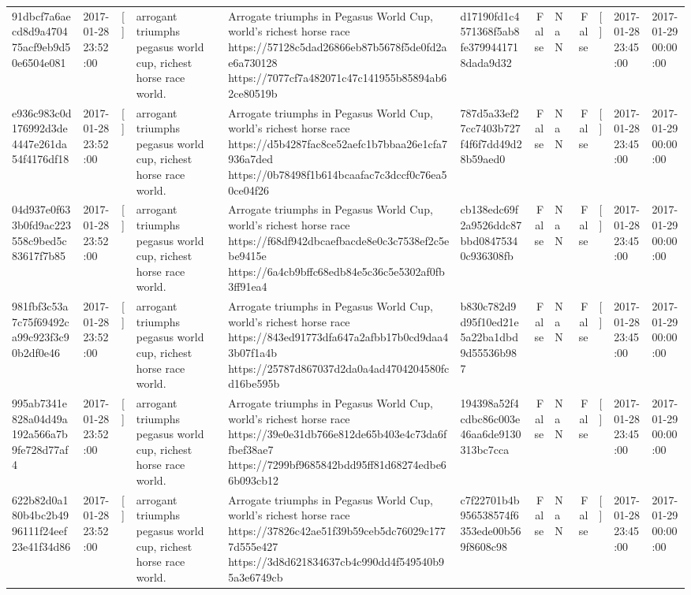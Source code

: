 \begin{tabular}{llllllrlrlll}
91dbcf7a6aecd8d9a470475acf9eb9d50e6504e081 & 2017-01-28 23:52:00 & [] & arrogant triumphs pegasus world cup, richest horse race world. & Arrogate triumphs in Pegasus World Cup, world's richest horse race https://57128c5dad26866eb87b5678f5de0fd2ae6a730128 https://7077cf7a482071c47c141955b85894ab62ce80519b & d17190fd1c4571368f5ab8fe3799441718dada9d32 & False & NaN & False & [] & 2017-01-28 23:45:00 & 2017-01-29 00:00:00 \\
e936c983c0d176992d3de4447e261da54f4176df18 & 2017-01-28 23:52:00 & [] & arrogant triumphs pegasus world cup, richest horse race world. & Arrogate triumphs in Pegasus World Cup, world's richest horse race https://d5b4287fac8ce52aefc1b7bbaa26e1cfa7936a7ded https://0b78498f1b614bcaafac7c3dccf0c76ea50ce04f26 & 787d5a33ef27cc7403b727f4f6f7dd49d28b59aed0 & False & NaN & False & [] & 2017-01-28 23:45:00 & 2017-01-29 00:00:00 \\
04d937e0f633b0fd9ac223558c9bed5c83617f7b85 & 2017-01-28 23:52:00 & [] & arrogant triumphs pegasus world cup, richest horse race world. & Arrogate triumphs in Pegasus World Cup, world's richest horse race https://f68df942dbcaefbacde8e0c3c7538ef2c5ebe9415e https://6a4cb9bffc68edb84e5c36c5e5302af0fb3ff91ea4 & cb138edc69f2a9526ddc87bbd08475340c936308fb & False & NaN & False & [] & 2017-01-28 23:45:00 & 2017-01-29 00:00:00 \\
981fbf3c53a7c75f69492ca99c923f3c90b2df0e46 & 2017-01-28 23:52:00 & [] & arrogant triumphs pegasus world cup, richest horse race world. & Arrogate triumphs in Pegasus World Cup, world's richest horse race https://843ed91773dfa647a2afbb17b0cd9daa43b07f1a4b https://25787d867037d2da0a4ad4704204580fcd16be595b & b830c782d9d95f10ed21e5a22ba1dbd9d55536b987 & False & NaN & False & [] & 2017-01-28 23:45:00 & 2017-01-29 00:00:00 \\
995ab7341e828a04d49a192a566a7b9fe728d77af4 & 2017-01-28 23:52:00 & [] & arrogant triumphs pegasus world cup, richest horse race world. & Arrogate triumphs in Pegasus World Cup, world's richest horse race https://39e0e31db766e812de65b403e4c73da6ffbef38ae7 https://7299bf9685842bdd95ff81d68274edbe66b093cb12 & 194398a52f4cdbc86c003e46aa6de9130313bc7cca & False & NaN & False & [] & 2017-01-28 23:45:00 & 2017-01-29 00:00:00 \\
622b82d0a180b4bc2b4996111f24eef23e41f34d86 & 2017-01-28 23:52:00 & [] & arrogant triumphs pegasus world cup, richest horse race world. & Arrogate triumphs in Pegasus World Cup, world's richest horse race https://37826c42ae51f39b59ceb5dc76029c1777d555e427 https://3d8d621834637cb4c990dd4f549540b95a3e6749cb & c7f22701b4b956538574f6353ede00b569f8608c98 & False & NaN & False & [] & 2017-01-28 23:45:00 & 2017-01-29 00:00:00 \\

\end{tabular}
